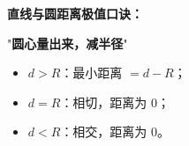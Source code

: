 \begin{summarybox}
\textbf{直线与圆距离极值口诀：}

\begin{center}
"\textbf{圆心量出来，减半径}"
\end{center}

\begin{itemize}
  \item $d>R$：最小距离 $=d-R$；
  \item $d=R$：相切，距离为 $0$；
  \item $d<R$：相交，距离为 $0$。
\end{itemize}
\end{summarybox}
